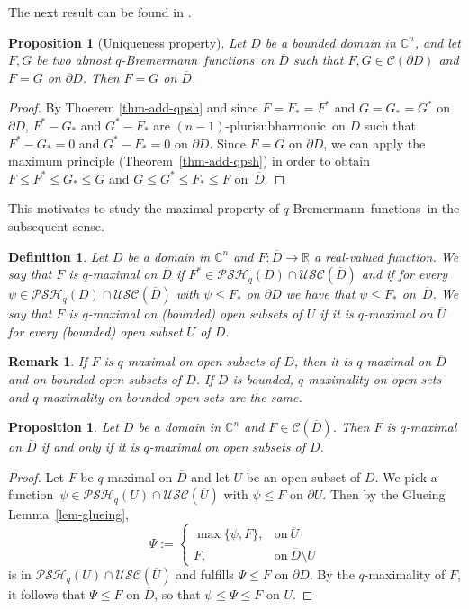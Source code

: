 \documentclass[10pt,a4paper]{amsart}
\newtheorem{prop}[thm]{Proposition}
\newtheorem{defn}[thm]{Definition}
\newtheorem{rem}[thm]{Remark}
\numberwithin{equation}{section}
\newcommand{\cbb}{\mathbb{C}}
\newcommand{\rbb}{\mathbb{R}}
\newcommand{\ccal}{\mathcal{C}}
\newcommand{\USC}{\mathcal{USC}}
\newcommand{\qbrem}{$q$-Bremermann}
\newcommand{\psh}{pluri\-sub\-harmonic}
\newcommand{\PSH}{\mathcal{PSH}}
\newcommand{\cl}[1]{\overline{#1}}
\newcommand{\fct}{function}
\newcommand{\fcts}{functions}
\newcommand{\cld}{\overline{D}}
\begin{document}
The next result can be found in \cite{Sl84}.

\begin{prop}[Uniqueness property]\label{prop-unique-qbrem} Let $D$ be a bounded domain in $\cbb^n$, and let $F,G$ be two almost \qbrem\ \fcts\ on $\cl{D}$ such that $F,G \in \ccal(\partial D)$ and $F=G$ on $\partial D$. Then $F=G$ on $\cld$.
\end{prop}

\begin{proof} By Thoerem \ref{thm-add-qpsh} and since $F=F_*=F^*$ and $G=G_*=G^*$ on $\partial D$, $F^*-G_*$ and $G^*-F_*$ are $(n-1)$-\psh\ on $D$ such that $F^*-G_*= 0$ and $G^*-F_*=0$ on $\partial D$. Since $F=G$ on $\partial D$, we can apply the maximum principle (Theorem~\ref{thm-add-qpsh}) in order to obtain $F\leq F^* \leq G_* \leq G$ and $G\leq G^* \leq F_* \leq F$ on~$\cld$.
\end{proof}

This motivates to study the maximal property of \qbrem\ \fcts\ in the subsequent sense.

\begin{defn} Let $D$ be a domain in $\cbb^n$ and $F:\cld \to \rbb$ a real-valued \fct. We say that $F$ is \textit{$q$-maximal on $\cld$} if $F^*\in\PSH_q(D)\cap\USC(\cld)$ and if for every $\psi \in \PSH_q(D)\cap\USC(\cl{D})$ with $\psi \leq F_*$ on $\partial D$ we have that $\psi \leq F_*$ on~$\cld$. We say that $F$ is \textit{$q$-maximal on (bounded) open subsets of $U$} if it is $q$-maximal on $\cl{U}$ for every (bounded) open subset $U$ of $D$.
\end{defn}

\begin{rem} If $F$ is $q$-maximal on open subsets of $D$, then it is $q$-maximal on $\cld$ and on bounded open subsets of $D$. If $D$ is bounded, $q$-maximality on open sets and $q$-maximality on bounded open sets are the same.
\end{rem}

\begin{prop}\label{prop-equiv-glob-loc-q-max} Let $D$ be a domain in $\cbb^n$ and $F\in\ccal(\cld)$. Then $F$ is $q$-maximal on $\cld$ if and only if it is $q$-maximal on open subsets of $D$.
\end{prop}

\begin{proof} Let $F$ be $q$-maximal on $\cld$ and let $U$ be an open subset of $D$. We pick a \fct\ $\psi \in \PSH_q(U)\cap \USC(\cl{U})$ with $\psi \leq F$ on $\partial U$. Then by the Glueing Lemma~\ref{lem-glueing},
\[
\Psi := \begin{cases} \max\{\psi,F\}, & \text{on}\ \cl{U}\\ F, & \text{on}\ \cld\setminus U \end{cases}
\]
is in $\PSH_q(U)\cap \USC(\cl{U})$ and fulfills $\Psi \leq F$ on $\partial D$. By the $q$-maximality of $F$, it follows that $\Psi\leq F$ on $\cld$, so that $\psi\leq\Psi \leq F$ on $U$.
\end{proof}
\end{document}
